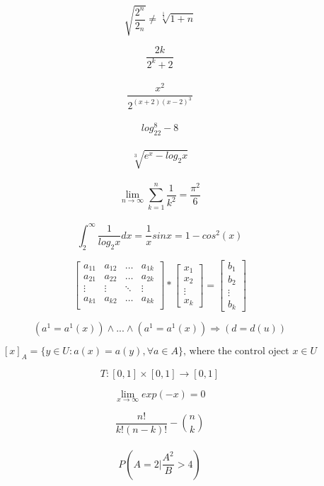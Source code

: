 \documentclass[a4paper]{article}
\begin{document}
$$ \sqrt{ \frac{2^{n}}{2_n}} \neq \sqrt[\frac{1}{3}]{1+n} $$


 $$ \frac{2k}{2^k+2} $$\\



 $$ \frac{x^2}{2^{(x+2)(x-2)^3}} $$\\
 
  $$ log_22^8-8 $$\\

$$ \sqrt[3]{e^x-log_2x} $$\\


$$ \lim_{n\to\infty} \sum_{k=1}^{n}\frac{1}{k^2}=  \frac{\pi^2}{6} $$\\

$$ \int_{2}^{\infty}  \frac{1}{log_2x}dx=  \frac{1}{x}sinx=1-cos^2(x) $$





$$
\left[ \begin{array}{cccc}
a_{11} & a_{12} & \ldots & a_{1k} \\
a_{21} & a_{22} & \ldots & a_{2k}\\
\vdots & \vdots & \ddots & \vdots \\
a_{k1} & a_{k2} & \ldots & a_{kk}\\
\end{array} \right]
*
\left[ \begin{array}{c}
x_{1}\\
 x_{2}\\
 \vdots \\
 x_{k} 
 \end{array} \right]
 =
 \left[ \begin{array}{c}
b_{1}\\
b_{2}\\
\vdots \\
b_{k} 
\end{array} \right]$$


$$ (a^{1}=a^{1}(x))\wedge ... \wedge (a^{1}=a^{1}(x)) \Rightarrow (d=d(u)) $$

$$[x]_A=\{y\in U:a(x)=a(y),\forall a \in A\} \textrm{, where the control oject } x\in U $$

$$ T:[0,1]\times[0,1] \rightarrow[0,1] $$


$$ \lim_{x\to\infty}exp(-x)=0 $$

 $$ \frac{n!}{k!(n-k)!} -{n \choose k} $$\\
 
 $$ P\left( A=2\bigg|\frac{A^{2}}{B}>4\right) $$ 
\end{document}
